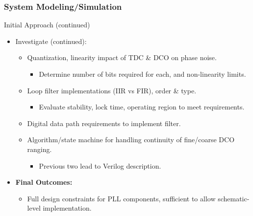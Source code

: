 \documentclass[t, screen, aspectratio=43]{beamer}
\begin{document}
\begin{frame}
	\frametitle{System Modeling/Simulation}
	\begin{block}{Initial Approach (continued)}
		\begin{itemize}
			\footnotesize
			\item Investigate (continued):
			\begin{itemize}
				\footnotesize
				\item Quantization, linearity impact of TDC \& DCO on phase noise.
				\begin{itemize}
					\scriptsize
					\item Determine number of bits required for each, and non-linearity limits.  
				\end{itemize}
				\item Loop filter implementations (IIR vs FIR), order \& type.
				\begin{itemize}
					\scriptsize
					\item Evaluate stability, lock time, operating region to meet requirements. 
				\end{itemize}
				\item Digital data path requirements to implement filter.
				\item Algorithm/state machine for handling continuity of fine/coarse DCO ranging. 
				\begin{itemize}
					\scriptsize
					\item Previous two lead to Verilog description.  
				\end{itemize}
			\end{itemize}
			\item \textbf{Final Outcomes:}
			\begin{itemize}
				\footnotesize
				\item Full design constraints for PLL components, sufficient to allow schematic-level implementation.
			\end{itemize}
		\end{itemize}    
	\end{block}
\end{frame}

\end{document}
